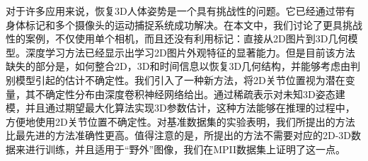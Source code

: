 

    对于许多应用来说，恢复3D人体姿势是一个具有挑战性的问题。它已经通过带有身体标记和多个摄像头的运动捕捉系统成功解决。在本文中，我们讨论了更具挑战性的案例，不仅使用单个相机，而且还没有利用标记：直接从2D图片到3D几何模型。深度学习方法已经显示出学习2D图片外观特征的显著能力。但是目前该方法缺失的部分是，如何整合2D，3D和时间信息以恢复3D几何结构，并能够考虑由判别模型引起的估计不确定性。我们引入了一种新方法，将2D关节位置视为潜在变量，其不确定性分布由深度卷积神经网络给出。通过稀疏表示对未知3D姿态建模，并且通过期望最大化算法实现3D参数估计，这种方法能够在推理的过程中，方便地使用2D关节位置不确定性。对基准数据集的实验表明，我们所提出的方法比最先进的方法准确性更高。值得注意的是，所提出的方法不需要对应的2D-3D数据来进行训练，并且适用于“野外”图像，我们在MPII数据集上证明了这一点。


